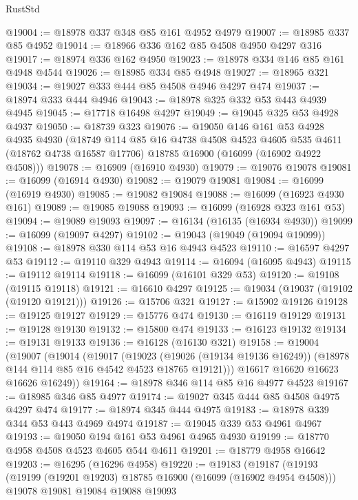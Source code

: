 \begin{lexlean}{RustStd}
\begin{coremodule}
@19004 := @18978 @337 @348 @85 @161 @4952 @4979
@19007 := @18985 @337 @85 @4952
@19014 := @18966 @336 @162 @85 @4508 @4950 @4297 @316
@19017 := @18974 @336 @162 @4950
@19023 := @18978 @334 @146 @85 @161 @4948 @4544
@19026 := @18985 @334 @85 @4948
@19027 := @18965 @321
@19034 := @19027 @333 @444 @85 @4508 @4946 @4297 @474
@19037 := @18974 @333 @444 @4946
@19043 := @18978 @325 @332 @53 @443 @4939 @4945
@19045 := @17718 @16498 @4297
@19049 := @19045 @325 @53 @4928 @4937
@19050 := @18739 @323
@19076 := @19050
    @146
    @161
    @53
    @4928
    @4935
    @4930
    (@18749
      @114
      @85
      @16
      @4738
      @4508
      @4523
      @4605
      @535
      @4611
      (@18762 @4738 @16587 @17706)
      @18785
      @16900
      (@16099 (@16902 @4922 @4508)))
@19078 := @16909 (@16910 @4930)
@19079 := @19076 @19078
@19081 := @16099 (@16914 @4930)
@19082 := @19079 @19081
@19084 := @16099 (@16919 @4930)
@19085 := @19082 @19084
@19088 := @16099 (@16923 @4930 @161)
@19089 := @19085 @19088
@19093 := @16099 (@16928 @323 @161 @53)
@19094 := @19089 @19093
@19097 := @16134 (@16135 (@16934 @4930))
@19099 := @16099 (@19097 @4297)
@19102 := @19043 (@19049 (@19094 @19099))
@19108 := @18978 @330 @114 @53 @16 @4943 @4523
@19110 := @16597 @4297 @53
@19112 := @19110 @329 @4943
@19114 := @16094 (@16095 @4943)
@19115 := @19112 @19114
@19118 := @16099 (@16101 @329 @53)
@19120 := @19108 (@19115 @19118)
@19121 := @16610 @4297
@19125 := @19034 (@19037 (@19102 (@19120 @19121)))
@19126 := @15706 @321
@19127 := @15902 @19126
@19128 := @19125 @19127
@19129 := @15776 @474
@19130 := @16119 @19129
@19131 := @19128 @19130
@19132 := @15800 @474
@19133 := @16123 @19132
@19134 := @19131 @19133
@19136 := @16128 (@16130 @321)
@19158 := @19004
    (@19007
      (@19014
        (@19017
          (@19023
            (@19026 (@19134 @19136 @16249))
            (@18978 @144 @114 @85 @16 @4542 @4523 @18765 @19121)))
        @16617
        @16620
        @16623
        @16626
        @16249))
@19164 := @18978 @346 @114 @85 @16 @4977 @4523
@19167 := @18985 @346 @85 @4977
@19174 := @19027 @345 @444 @85 @4508 @4975 @4297 @474
@19177 := @18974 @345 @444 @4975
@19183 := @18978 @339 @344 @53 @443 @4969 @4974
@19187 := @19045 @339 @53 @4961 @4967
@19193 := @19050 @194 @161 @53 @4961 @4965 @4930
@19199 := @18770 @4958 @4508 @4523 @4605 @544 @4611
@19201 := @18779 @4958 @16642
@19203 := @16295 (@16296 @4958)
@19220 := @19183
    (@19187
      (@19193
        (@19199 (@19201 @19203) @18785 @16900 (@16099 (@16902 @4954 @4508)))
        @19078
        @19081
        @19084
        @19088
        @19093

\end{coremodule}
\end{lexlean}
